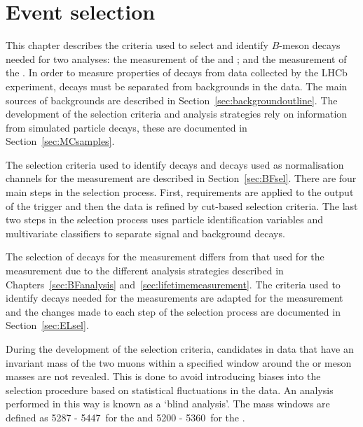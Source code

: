 \chapter{{\bf Event selection}}
\label{selection_chapter}

This chapter describes the criteria used to select and identify $B$-meson decays needed for two analyses: the measurement of the \bdmumu and \bsmumu \BFs; and the measurement of the \bsmumu \el. 
In order to measure properties of \bmumu decays from data collected by the LHCb experiment, \bmumu decays must be separated from backgrounds in the data. The main sources of backgrounds are described in Section~\ref{sec:backgroundoutline}.
The development of the selection criteria and analysis strategies rely on information from simulated particle decays, these are documented in Section~\ref{sec:MCsamples}. 


The selection criteria used to identify \bmumu decays and decays used as normalisation channels for the \BF measurement are described in Section~\ref{sec:BFsel}. There are four main steps in the selection process. First, requirements are applied to the output of the trigger and then the data is refined by cut-based selection criteria. The last two steps in the selection process uses particle identification variables and multivariate classifiers to separate signal and background decays.

The selection of decays for the \el measurement differs from that used for the \BF measurement due to the different analysis strategies described in Chapters~\ref{sec:BFanalysis} and~\ref{sec:lifetimemeasurement}. The criteria used to identify decays needed for the \BF measurements are adapted for the \el measurement and the changes made to each step of the \BF selection process are documented in Section~\ref{sec:ELsel}. %

During the development of the selection criteria, \bmumu candidates in data that have an invariant mass of the two muons within a specified window around the \bs or \bd meson masses are not revealed. This is done to avoid introducing biases into the selection procedure based on statistical fluctuations in the data. An analysis performed in this way is known as a `blind analysis'. The mass windows are defined as 5287 - 5447~\mevcc for the \bs and 5200 - 5360~\mevcc for the \bd.

